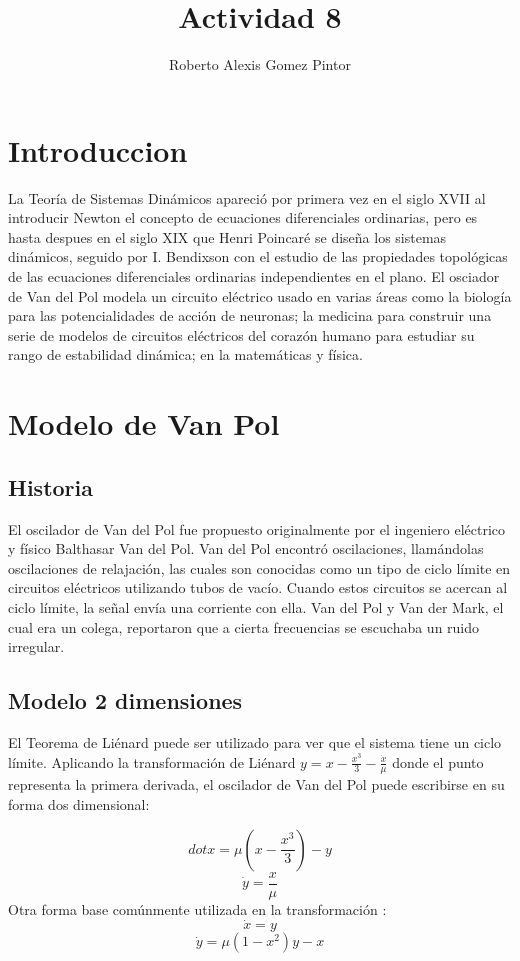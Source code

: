 \documentclass{article}
\title{Actividad 8}
\author{Roberto Alexis Gomez Pintor}
\begin{document}
\maketitle
\section{Introduccion}
La Teoría de Sistemas Dinámicos apareció por primera vez en el siglo XVII al introducir Newton el concepto de ecuaciones diferenciales ordinarias, pero es hasta despues en el siglo XIX que Henri Poincaré se diseña los sistemas dinámicos, seguido por I. Bendixson con el estudio de las propiedades topológicas de las ecuaciones diferenciales ordinarias independientes en el plano. El osciador de Van del Pol modela un circuito eléctrico usado en varias áreas como la biología para las potencialidades de acción de neuronas; la medicina para construir una serie de modelos de circuitos eléctricos del corazón humano para estudiar su rango de estabilidad dinámica; en la matemáticas y física.
\section{Modelo de Van Pol}
\subsection{Historia}
El oscilador de Van del Pol fue propuesto originalmente por el ingeniero eléctrico y físico Balthasar Van del Pol. Van del Pol encontró oscilaciones, llamándolas oscilaciones de relajación, las cuales son conocidas como un tipo de ciclo límite en circuitos eléctricos utilizando tubos de vacío. Cuando estos circuitos se acercan al ciclo límite, la señal envía una corriente con ella. Van del Pol y Van der Mark, el cual era un colega, reportaron que a cierta frecuencias se escuchaba un ruido irregular.
\subsection{Modelo 2 dimensiones}
El Teorema de Liénard puede ser utilizado para ver que el sistema tiene un ciclo límite. Aplicando la transformación de Liénard $y = x - \frac{x^3}{3} - \frac{\dot{x}}{\mu}$  donde el punto representa la primera derivada, el oscilador de Van del Pol puede escribirse en su forma dos dimensional:

\[dot{x} = \mu (x - \frac{x^3}{3}) - y \]
\[\dot{y} = \frac{x}{\mu} \]
Otra forma base comúnmente utilizada en la transformación :
\[\dot{x} = y \]
\[\dot{y} = \mu (1 - x^2 )y - x \]
\end{document}
